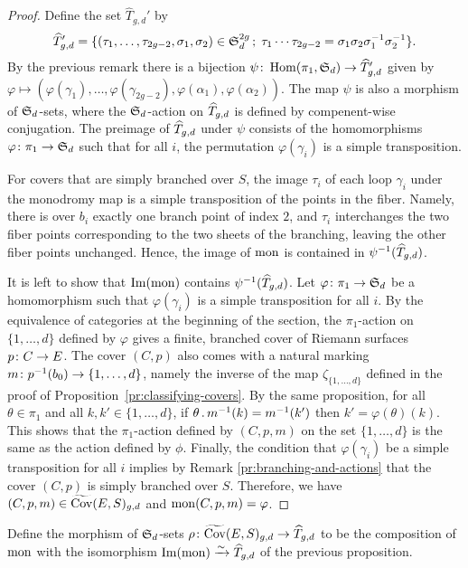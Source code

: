 \begin{proof}
 Define the set $\widehat{T}_{g,d}'$ by
 \[\widehat{T}_{g,d}' = \{(\tau_1,\dotsc,\tau_{2g-2},\sigma_1,\sigma_2)\in \operatorname{\mathfrak{S}}_d^{2g} \,;\; \tau_1\dotsm\tau_{2g-2}=\sigma_1\sigma_2\sigma_1^{-1}\sigma_2^{-1}\}.\]
 By the previous remark there is a bijection $\psi\colon\operatorname{Hom}(\pi_1,\operatorname{\mathfrak{S}}_d)\to \widehat{T}_{g,d}'$ given by $\varphi\mapsto(\varphi(\gamma_1),\dotsc,\varphi(\gamma_{2g-2}),\varphi(\alpha_1),\varphi(\alpha_2))$. The map $\psi$ is also a morphism of \mbox{$\operatorname{\mathfrak{S}}_d$-sets}, where the $\operatorname{\mathfrak{S}}_d$-action on $\widehat{T}_{g,d}$ is defined by compenent-wise conjugation. The preimage of $\widehat{T}_{g,d}$ under $\psi$ consists of the homomorphisms $\varphi\colon\pi_1\to\operatorname{\mathfrak{S}}_d$ such that for all $i$, the permutation $\varphi(\gamma_i)$ is a simple transposition.
 
 For covers that are simply branched over $S$, the image $\tau_i$ of each loop $\gamma_i$ under the monodromy map is a simple transposition of the points in the fiber. Namely, there is over $b_i$ exactly one branch point of index $2$, and $\tau_i$ interchanges the two fiber points corresponding to the two sheets of the branching, leaving the other fiber points unchanged. Hence, the image of $\operatorname{mon}$ is contained in $\psi^{-1}(\widehat{T}_{g,d})$.
 
 It is left to show that $\operatorname{Im}(\operatorname{mon})$ contains $\psi^{-1}(\widehat{T}_{g,d})$. Let $\varphi\colon\pi_1\to\operatorname{\mathfrak{S}}_d$ be a homomorphism such that $\varphi(\gamma_i)$ is a simple transposition for all $i$. By the equivalence of categories at the beginning of the section, the $\pi_1$-action on $\{1,\dotsc,d\}$ defined by $\varphi$ gives a finite, branched cover of Riemann surfaces $p\colon C\to E$. The cover $(C,p)$ also comes with a natural marking $m\colon p^{-1}(b_0)\to\{1,\dotsc,d\}$, namely the inverse of the map $\zeta_{\{1,\dotsc,d\}}$ defined in the proof of Proposition~\ref{pr:classifying-covers}. By the same proposition, for all $\theta\in\pi_1$ and all $k,k'\in\{1,\dotsc,d\}$, if $\theta\,.\, m^{-1}(k)=m^{-1}(k')$ then $k'=\varphi(\theta)(k)$. This shows that the $\pi_1$-action defined by $(C,p,m)$ on the set $\{1,\dotsc,d\}$ is the same as the action defined by $\phi$. Finally, the condition that $\varphi(\gamma_i)$ be a simple transposition for all $i$ implies by Remark \ref{pr:branching-and-actions} that the cover $(C,p)$ is simply branched over $S$. Therefore, we have $(C,p,m)\in\widetilde{\operatorname{Cov}}(E,S)_{g,d}$ and $\operatorname{mon}(C,p,m)=\varphi$.
\end{proof}

Define the morphism of $\operatorname{\mathfrak{S}}_d$-sets $\rho\colon \widetilde{\operatorname{Cov}}(E,S)_{g,d} \to \widehat{T}_{g,d}$ to be the composition of $\operatorname{mon}$ with the isomorphism $\operatorname{Im}(\operatorname{mon})\xrightarrow{\sim}\widehat{T}_{g,d}$ of the previous proposition.

